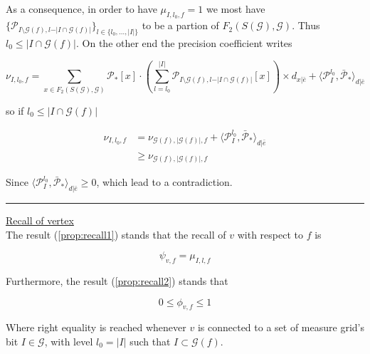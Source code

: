 \documentclass[a4paper, 11pt]{article}
\begin{document}
As a consequence, in order to have $\mu_{I, l_0, f} = 1$ we most have $ \lbrace \mathcal{P}_{I\setminus \mathcal{G}(f), l-\vert I \cap \mathcal{G}(f)\vert} \rbrace_{l \in \{ l_0, \ldots, \vert I \vert \}}$ to be a partion of $F_2(S(\mathcal{G}), \mathcal{G})$. Thus $l_0 \leq \vert I \cap \mathcal{G}(f) \vert$. On the other end the precision coefficient writes

\begin{equation*}
\nu_{I, l_0, f} = \sum_{x \in F_2(S(\mathcal{G}), \mathcal{G})}  \mathcal{P}_{*}[x] \cdot \left( \sum_{l=l_0}^{\vert I \vert} \mathcal{P}_{I\setminus \mathcal{G}(f), l-\vert I \cap \mathcal{G}(f)\vert} [x] \right) \times d_{x \vert \bar{e}} +  \langle  \mathcal{P}_{I}^{l_0}, \bar{\mathcal{P}}_{*}\rangle_{d \vert \bar{e}}
\end{equation*}

so if $l_0 \leq \vert I \cap \mathcal{G}(f) \vert$

\begin{align*}
\nu_{I, l_0, f} &=  \nu_{\mathcal{G}(f), \vert \mathcal{G}(f) \vert, f} + \langle  \mathcal{P}_{I}^{l_0}, \bar{\mathcal{P}}_{*}\rangle_{d \vert \bar{e}}\\
&\geq \nu_{\mathcal{G}(f), \vert \mathcal{G}(f) \vert, f}
\end{align*}

Since $\langle  \mathcal{P}_{I}^{l_0}, \bar{\mathcal{P}}_{*}\rangle_{d \vert \bar{e}} \geq 0$, which lead to a contradiction.

\begin{center}
\rule[0pt]{100pt}{1pt} 
\end{center}

\underline{Recall of vertex}\\

The result (\ref{prop:recall1}) stands that the recall of $v$ with respect to $f$ is

\begin{equation*}
\psi_{v, f} = \mu_{I, l, f}
\end{equation*}

Furthermore, the result (\ref{prop:recall2}) stands that 

\begin{equation*}
0 \leq \phi_{v, f} \leq 1
\end{equation*}

Where right equality is reached whenever $v$ is connected to a set of measure grid's bit $I \in \mathcal{G}$, with level $l_0 = \vert I \vert$ such that $I \subset \mathcal{G}(f)$. \\ 
\end{document}
